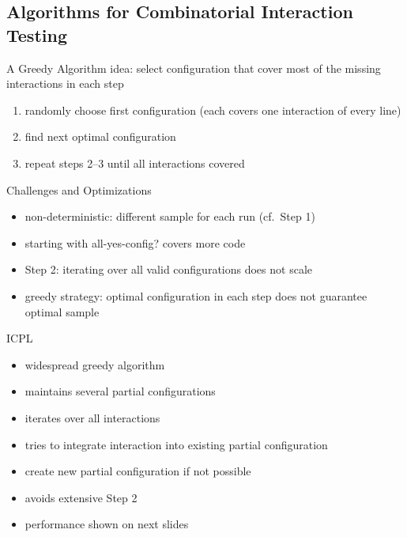 \subsection{Algorithms for Combinatorial Interaction Testing}
\begin{frame}{\myframetitle}
	\begin{mycolumns}[widths={63}]
		\begin{definition}{A Greedy Algorithm}
			idea: select configuration that cover most of the missing interactions in each step
			\begin{enumerate}
				\item randomly choose first configuration (each covers one interaction of every line)
				\item find next optimal configuration
				\item repeat steps 2--3 until all interactions covered
			\end{enumerate}
		\end{definition}
		\pause
		\begin{note}{Challenges and Optimizations}
			\begin{itemize}
				\item non-deterministic: different sample for each run (cf.\ Step 1)
				\item starting with all-yes-config? covers more code
				\item Step 2: iterating over all valid configurations does not scale
				\item greedy strategy: optimal configuration in each step does not guarantee optimal sample
			\end{itemize}
		\end{note}
	\mynextcolumn
		\pause
		\begin{definition}{ICPL\mysource{\icpl}}
			\begin{itemize}
				\item widespread greedy algorithm
				\item maintains several partial configurations
				\item iterates over all interactions
				\item tries to integrate interaction into existing partial configuration
				\item create new partial configuration if not possible
				\item avoids extensive Step 2
				\item performance shown on next slides
			\end{itemize}
		\end{definition}
	\end{mycolumns}
\end{frame}

